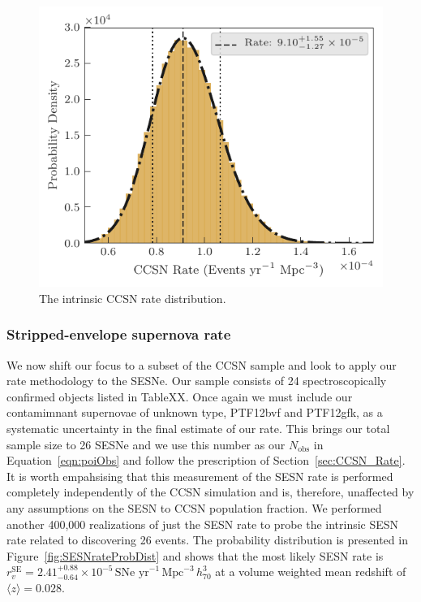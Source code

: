 \documentclass[a4paper,fleqn,usenatbib]{mnras}
\begin{document}
\begin{figure}
	\includegraphics[width=\linewidth]{./allCC_Rate.pdf}
    \caption{The intrinsic CCSN rate distribution.}
    \label{fig:ccRateDist}
\end{figure}


\subsubsection{Stripped-envelope supernova rate}
\label{SESN_Rate}

We now shift our focus to a subset of the CCSN sample and look to apply our rate methodology to the SESNe. Our sample consists of 24 spectroscopically confirmed objects listed in TableXX. Once again we must include our contamimnant supernovae of unknown type, PTF12bvf and PTF12gfk, as a systematic uncertainty in the final estimate of our rate. This brings our total sample size to 26 SESNe and we use this number as our $N_\mathrm{obs}$ in Equation~\ref{eqn:poiObs} and follow the prescription of Section~\ref{sec:CCSN_Rate}. It is worth empahsising that this measurement of the SESN rate is performed completely independently of the CCSN simulation and is, therefore, unaffected by any assumptions on the SESN to CCSN population fraction. We performed another 400,000 realizations of just the SESN rate to probe the intrinsic SESN rate related to discovering 26 events. The probability distribution is presented in Figure~\ref{fig:SESNrateProbDist} and shows that the most likely SESN rate is $r^\mathrm{SE}_v=2.41_{-0.64}^{+0.88}\times10^{-5}\,\text{SNe yr}^{-1}\,\text{Mpc}^{-3}\, h_{70}^{3}$ at a volume weighted mean redshift of $ \langle z \rangle = 0.028$.
\end{document}

